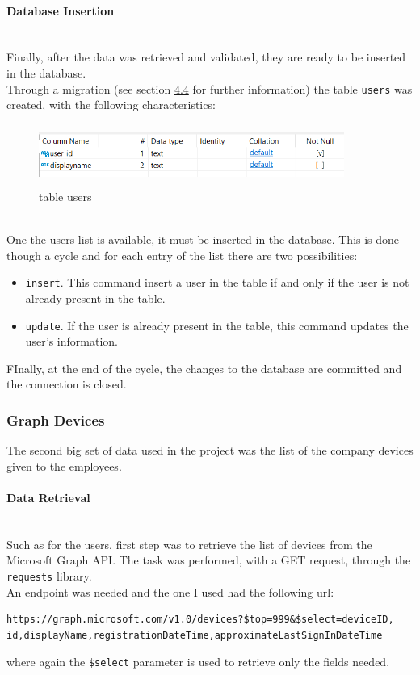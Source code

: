 \documentclass[12pt, a4paper, oneside]{article}
\begin{document}
\paragraph{Database Insertion} ~\\
Finally, after the data was retrieved and validated, they are ready to be inserted in the database.\\
Through a migration (see section \hyperref[subsec:migrations]{4.4} for further information) the table \texttt{users} was created, with the following characteristics:
\begin{figure}[h]
    \centering
    \includegraphics[width=10cm, height=2cm]{table-users.png}
    \caption{table users}
\end{figure}\\

One the users list is available, it must be inserted in the database. This is done though a cycle and for each entry of the list there are two possibilities:
\begin{itemize}
    \item \texttt{insert}. This command insert a user in the table if and only if the user is not already present in the table.
    \item \texttt{update}. If the user is already present in the table, this command updates the user's information.
\end{itemize}
FInally, at the end of the cycle, the changes to the database are committed and the connection is closed.

\newpage
\subsubsection{Graph Devices}
The second big set of data used in the project was the list of the company devices given to the employees.

\paragraph{Data Retrieval} ~\\
Such as for the users, first step was to retrieve the list of devices from the Microsoft Graph API. The task was performed, with a GET request, through the \texttt{requests} library.\\
An endpoint was needed and the one I used had the following url:  
\begin{Verbatim}[fontsize=\small]
https://graph.microsoft.com/v1.0/devices?$top=999&$select=deviceID,
id,displayName,registrationDateTime,approximateLastSignInDateTime
\end{Verbatim}
where again the \texttt{\$select} parameter is used to retrieve only the fields needed.
\end{document}
